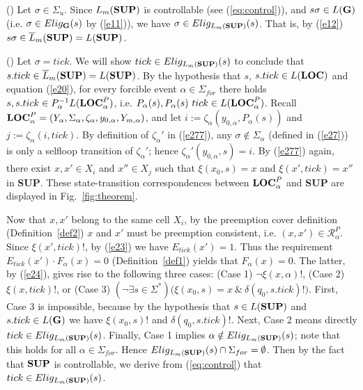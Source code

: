 \documentclass[twocolumn]{autart}
\newcommand{\rmnum}[1]{\romannumeral #1}
\begin{document}
(\rmnum{1}) Let $\sigma \in \Sigma_u$. Since $L_m(\bf SUP)$ is
controllable (see (\ref{eq:control})), and $s\sigma \in L({\bf G})$
(i.e. $\sigma \in Elig_{\bf G}(s)$ by (\ref{e11})), we have $\sigma
\in Elig_{L_m({\bf SUP})}(s)$. That is, by (\ref{e12}) $s\sigma \in
\overline{L}_m({\bf SUP}) = L({\bf SUP})$.

(\rmnum{2}) Let $\sigma = tick$. We will show $tick \in
Elig_{L_m({\bf SUP})}(s)$ to conclude that $s.tick \in
\overline{L}_m({\bf SUP}) = L({\bf SUP})$. By the hypothesis that
$s$, $s.tick \in L({\bf LOC})$ and equation (\ref{e20}), for every
forcible event $\alpha \in \Sigma_{for}$ there holds $s, s.tick \in
P_\alpha^{-1}L({\bf LOC}^P_{\alpha})$, i.e. $P_\alpha(s),
P_\alpha(s)\ tick \in L({\bf LOC}^P_{\alpha})$. Recall ${\bf
LOC}^P_{\alpha} = (Y_\alpha, \Sigma_\alpha, \zeta_\alpha,
y_{0,\alpha}, Y_{m,\alpha})$, and let $i :=
\zeta_\alpha(y_{0,\alpha}, P_\alpha(s))$ and $j := \zeta_\alpha(i,
tick)$. By definition of $\zeta_\alpha'$ in (\ref{e277}), any
$\sigma \notin \Sigma_\alpha$ (defined in (\ref{e27})) is only a
selfloop transition of $\zeta_\alpha'$; hence
$\zeta_\alpha'(y_{0,\alpha}, s)=i$.  By (\ref{e277}) again, there
exist $x, x' \in X_i$ and $x'' \in X_j$ such that $\xi(x_0,s)=x$ and
$\xi(x', tick) = x''$ in {\bf SUP}. These state-transition
correspondences between ${\bf LOC}^P_{\alpha}$ and {\bf SUP} are
displayed in Fig.~\ref{fig:theorem}.

Now that $x,x'$ belong to the same cell $X_i$, by the preemption
cover definition (Definition~\ref{def2}) $x$ and $x'$ must be
preemption consistent, i.e. $(x, x') \in \mathcal {R}^P_{\alpha}$.
Since $\xi(x', tick)!$, by (\ref{e23}) we have $E_{tick}(x') = 1$.
Thus the requirement $E_{tick}(x') \cdot F_\alpha(x) = 0$
(Definition~\ref{def1}) yields that $F_\alpha(x) = 0$. The latter,
by (\ref{e24}), gives rise to the following three cases: (Case 1)
$\neg \xi(x,\alpha)!$, (Case 2) $\xi(x,tick)!$, or (Case 3) $(\neg
\exists s\in \Sigma^*)\big( \xi(x_0,s)=x ~\&~\delta(q_0,
s.tick)!\big)$. First, Case 3 is impossible, because by the
hypothesis that $s \in L({\bf SUP})$ and $s.tick \in L({\bf G})$ we
have $\xi(x_0,s)!$ and $\delta(q_0, s.tick)!$.  Next, Case 2 means
directly $tick \in Elig_{L_m({\bf SUP})}(s)$. Finally, Case 1
implies { $\alpha \notin Elig_{L_m({\bf SUP})}(s)$}; note
that this holds for all $\alpha \in \Sigma_{for}$.  Hence
$Elig_{L_m({\bf SUP})}(s) \cap \Sigma_{for} = \emptyset$.  Then by
the fact that ${\bf SUP}$ is controllable, we derive from
(\ref{eq:control}) that $tick \in Elig_{L_m({\bf SUP})}(s)$.
\end{document}

